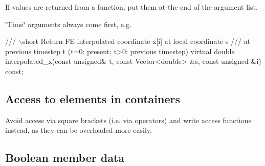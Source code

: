 \begin{DoxyItemize}
\item If values are returned from a function, put them at the end of the argument list.
\item \char`\"{}\+Time\char`\"{} arguments always come first, e.\+g. 
\begin{DoxyCode}
\textcolor{comment}{/// \(\backslash\)short Return FE interpolated coordinate x[i] at local coordinate s}
\textcolor{comment}{}\textcolor{comment}{/// at previous timestep t (t=0: present; t>0: previous timestep)}
\textcolor{comment}{}\textcolor{keyword}{virtual} \textcolor{keywordtype}{double} interpolated\_x(\textcolor{keyword}{const} \textcolor{keywordtype}{unsigned}& t, 
                              \textcolor{keyword}{const} Vector<double> &s,
                              \textcolor{keyword}{const} \textcolor{keywordtype}{unsigned} &i) \textcolor{keyword}{const};
\end{DoxyCode}

\end{DoxyItemize}\hypertarget{index_brackets}{}\subsection{Access to elements in containers}\label{index_brackets}

\begin{DoxyItemize}
\item Avoid access via square brackets (i.\+e. via operators) and write access functions instead, as they can be overloaded more easily.
\end{DoxyItemize}\hypertarget{index_boolean}{}\subsection{Boolean member data}\label{index_boolean}

